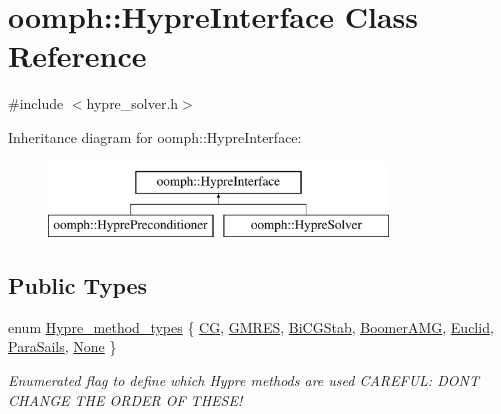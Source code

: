 \hypertarget{classoomph_1_1HypreInterface}{}\section{oomph\+:\+:Hypre\+Interface Class Reference}
\label{classoomph_1_1HypreInterface}


{\ttfamily \#include $<$hypre\+\_\+solver.\+h$>$}

Inheritance diagram for oomph\+:\+:Hypre\+Interface\+:\begin{figure}[H]
\begin{center}
\leavevmode
\includegraphics[height=2.000000cm]{classoomph_1_1HypreInterface}
\end{center}
\end{figure}
\subsection*{Public Types}
\begin{DoxyCompactItemize}
\item 
enum \hyperlink{classoomph_1_1HypreInterface_a6326c42293c21c62a189c4bfee03e2ab}{Hypre\+\_\+method\+\_\+types} \{ \newline
\hyperlink{classoomph_1_1HypreInterface_a6326c42293c21c62a189c4bfee03e2aba7adc4138b84c25731697dba47341d805}{CG}, 
\hyperlink{classoomph_1_1HypreInterface_a6326c42293c21c62a189c4bfee03e2aba4a50dcf26660a375d89af0e317fdcc45}{G\+M\+R\+ES}, 
\hyperlink{classoomph_1_1HypreInterface_a6326c42293c21c62a189c4bfee03e2aba226997dd74514b0f51fd1cdc2bb181eb}{Bi\+C\+G\+Stab}, 
\hyperlink{classoomph_1_1HypreInterface_a6326c42293c21c62a189c4bfee03e2abad4c3fefcba30744c942639c43a4cc061}{Boomer\+A\+MG}, 
\newline
\hyperlink{classoomph_1_1HypreInterface_a6326c42293c21c62a189c4bfee03e2abad818656a893f66dd2da6c5afa4bc002d}{Euclid}, 
\hyperlink{classoomph_1_1HypreInterface_a6326c42293c21c62a189c4bfee03e2aba48b74bf516629dfb5d39c0136c09f165}{Para\+Sails}, 
\hyperlink{classoomph_1_1HypreInterface_a6326c42293c21c62a189c4bfee03e2abaa67e521db30caa2fccc6c1a8cbb06fe5}{None}
 \}\begin{DoxyCompactList}\small\item\em Enumerated flag to define which Hypre methods are used C\+A\+R\+E\+F\+UL\+: D\+ON\textquotesingle{}T C\+H\+A\+N\+GE T\+HE O\+R\+D\+ER OF T\+H\+E\+S\+E! \end{DoxyCompactList}
\end{DoxyCompactItemize}
